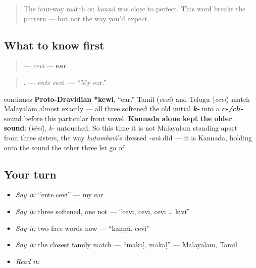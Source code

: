 \label{lesson:ML-C37-chevi}



\begin{quote}
The four-way match on \emph{kaṇṇŭ} was close to perfect. This word breaks the pattern — but not the way you'd expect.
\end{quote}

\subsection*{What to know first}
\begin{quote}
\textbf{} — \emph{cevi} — \textbf{ear}
\end{quote}

\begin{quote}
\textbf{ .} — \emph{ente cevi.} — \textquotedblleft{}My ear.\textquotedblright{}
\end{quote}

\begin{cousinweb}
\textbf{} continues \textbf{Proto-Dravidian *kewi}, \textquotedblleft{}ear.\textquotedblright{} Tamil \textbf{} (\emph{cevi}) and Telugu \textbf{} (\emph{cevi}) match Malayalam almost exactly — all three softened the old initial \emph{\textbf{k-}} into a \emph{\textbf{c-/ch-}} sound before this particular front vowel. \textbf{Kannada alone kept the older sound}: \textbf{} (\emph{kivi}), \emph{k-} untouched. So this time it is not Malayalam standing apart from three sisters, the way \emph{kuṭumbaṁ}'s dressed \emph{-aṁ} did — it is Kannada, holding onto the sound the other three let go of.
\end{cousinweb}

\subsection*{Your turn}
\begin{itemize}
\raggedright
  \item \emph{Say it:} \textquotedblleft{}ente cevi\textquotedblright{} — my ear
  \item \emph{Say it:} three softened, one not — \textquotedblleft{}cevi, cevi, cevi … kivi\textquotedblright{}
  \item \emph{Say it:} two face words now — \textquotedblleft{}kaṇṇŭ, cevi\textquotedblright{}
  \item \emph{Say it:} the closest family match — \textquotedblleft{}makaḷ, makaḷ\textquotedblright{} — Malayalam, Tamil
  \item \emph{Read it:} \textbf{}
\end{itemize}

